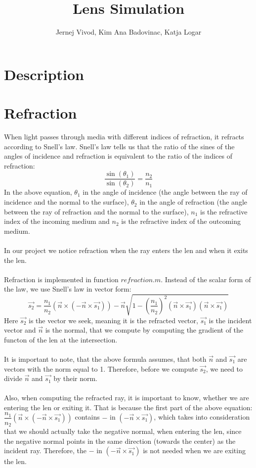 \documentclass[A4]{article}
\begin{document}
\title{Lens Simulation}
\author{Jernej Vivod, Kim Ana Badovinac, Katja Logar}
\maketitle
\section{Description}

\section{Refraction}
When light passes through media with different indices of refraction, it refracts according to Snell's law. Snell's law tells us that the ratio of the sines of the angles of incidence and refraction is equivalent to the ratio of the indices of refraction:
\[
	\dfrac{\sin(\theta_1)}{\sin(\theta_2)} = \dfrac{n_2}{n_1}
\]
In the above equation, $\theta_1$ in the angle of incidence (the angle between the ray of incidence and the normal to the surface), $\theta_2$ in the angle of refraction (the angle between the ray of refraction and the normal to the surface), $n_1$ is the refractive index of the incoming medium and $n_2$ is the refractive index of the outcoming medium. \\ \\
In our project we notice refraction when the ray enters the len and when it exits the len. \\ \\
Refraction is implemented in function $refraction.m$. Instead of the scalar form of the law, we use Snell's law in vector form:
\[
	\vec{s_2} = \dfrac{n_1}{n_2}(\vec{n}\times(-\vec{n}\times\vec{s_1})) - \vec{n}\sqrt{1-(\dfrac{n_1}{n_2})^2(\vec{n}\times\vec{s_1})(\vec{n}\times		\vec{s_1})}
\]
Here $\vec{s_2}$ is the vector we seek, meaning it is the refracted vector, $\vec{s_1}$ is the incident vector and $\vec{n}$ is the normal, that we compute by computing the gradient of the functon of the len at the intersection. \\ \\
It is important to note, that the above formula assumes, that both $\vec{n}$ and $\vec{s_1}$ are vectors with the norm equal to 1. Therefore, before we compute $\vec{s_2}$, we need to divide $\vec{n}$ and $\vec{s_1}$ by their norm. \\\\
Also, when computing the refracted ray, it is important to know, whether we are entering the len or exiting it. That is because the first part of the above equation: $\dfrac{n_1}{n_2}(\vec{n}\times(-\vec{n}\times\vec{s_1}))$ contains $-$ in $(-\vec{n}\times\vec{s_1})$, which takes into consideration that we should actually take the negative normal, when entering the len, since the negative normal points in the same direction (towards the center) as the incident ray. Therefore, the $-$ in  $(-\vec{n}\times\vec{s_1})$ is not needed when we are exiting the len.\\ \\
\end{document}

